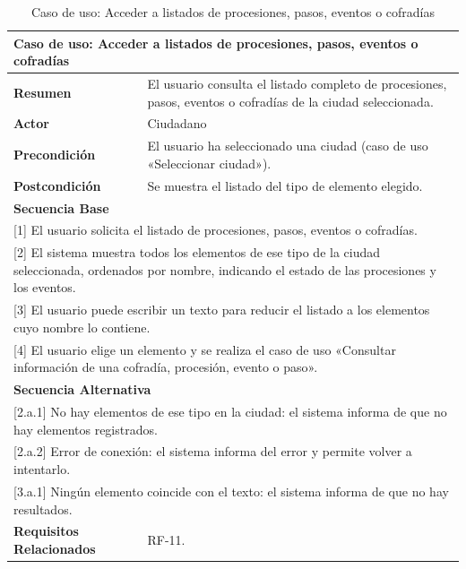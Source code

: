 \begin{table}[h!]
    \centering
    \renewcommand{\arraystretch}{1.5}

    \begin{tabular}{|p{4cm}|p{11cm}|}
        \hline
        \multicolumn{2}{|l|}{\textbf{Caso de uso: Acceder a listados de procesiones, pasos, eventos o cofradías}} \\
        \hline
        \textbf{Resumen} & El usuario consulta el listado completo de procesiones, pasos, eventos o cofradías de la ciudad seleccionada. \\
        \hline
        \textbf{Actor} & Ciudadano \\
        \hline
        \textbf{Precondición} & El usuario ha seleccionado una ciudad (caso de uso «Seleccionar ciudad»). \\
        \hline
        \textbf{Postcondición} & Se muestra el listado del tipo de elemento elegido. \\
        \hline
        \multicolumn{2}{|l|}{\textbf{Secuencia Base}} \\
        \hline
        \multicolumn{2}{|p{15cm}|}{ [1] El usuario solicita el listado de procesiones, pasos, eventos o cofradías. } \\
        \hline
        \multicolumn{2}{|p{15cm}|}{ [2] El sistema muestra todos los elementos de ese tipo de la ciudad seleccionada, ordenados por nombre, indicando el estado de las procesiones y los eventos. } \\
        \hline
        \multicolumn{2}{|p{15cm}|}{ [3] El usuario puede escribir un texto para reducir el listado a los elementos cuyo nombre lo contiene. } \\
        \hline
        \multicolumn{2}{|p{15cm}|}{ [4] El usuario elige un elemento y se realiza el caso de uso «Consultar información de una cofradía, procesión, evento o paso». } \\
        \hline
        \multicolumn{2}{|l|}{\textbf{Secuencia Alternativa}} \\
        \hline
        \multicolumn{2}{|p{15cm}|}{ [2.a.1] No hay elementos de ese tipo en la ciudad: el sistema informa de que no hay elementos registrados. } \\
        \hline
        \multicolumn{2}{|p{15cm}|}{ [2.a.2] Error de conexión: el sistema informa del error y permite volver a intentarlo. } \\
        \hline
        \multicolumn{2}{|p{15cm}|}{ [3.a.1] Ningún elemento coincide con el texto: el sistema informa de que no hay resultados. } \\
        \hline
        \textbf{Requisitos Relacionados} & RF-11. \\
        \hline
    \end{tabular}
    \caption{Caso de uso: Acceder a listados de procesiones, pasos, eventos o cofradías}
\end{table}

